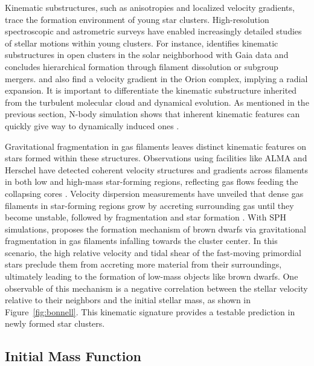 \documentclass[12pt]{ucsddissertation}
\begin{document}
\begin{CJK*}{UTF8}{gbsn}
Kinematic substructures, such as anisotropies and localized velocity gradients, trace the formation environment of young star clusters. High-resolution spectroscopic and astrometric surveys have enabled increasingly detailed studies of stellar motions within young clusters. For instance, \citet{Pang-2022} identifies kinematic substructures in open clusters in the solar neighborhood with Gaia data and concludes hierarchical formation through filament dissolution or subgroup mergers. \citet{Furesz-2008} and \citet{Swiggum-2021} also find a velocity gradient in the Orion complex, implying a radial expansion. It is important to differentiate the kinematic substructure inherited from the turbulent molecular cloud and dynamical evolution. As mentioned in the previous section, N-body simulation shows that inherent kinematic features can quickly give way to dynamically induced ones \citep[][]{Allison-2010}.


Gravitational fragmentation in gas filaments leaves distinct kinematic features on stars formed within these structures. Observations using facilities like ALMA and Herschel have detected coherent velocity structures and gradients across filaments in both low and high-mass star-forming regions, reflecting gas flows feeding the collapsing cores \citep[e.g.,][]{Kirk-2013, Beuther-2015, Kainulainen-2016, Lu-2018}. Velocity dispersion measurements have unveiled that dense gas filaments in star-forming regions grow by accreting surrounding gas until they become unstable, followed by fragmentation and star formation \citep[][]{Arzoumanian-2013}. With SPH simulations, \citet{Bonnell-2008} proposes the formation mechanism of brown dwarfs via gravitational fragmentation in gas filaments infalling towards the cluster center. In this scenario, the high relative velocity and tidal shear of the fast-moving primordial stars preclude them from accreting more material from their surroundings, ultimately leading to the formation of low-mass objects like brown dwarfs. One observable of this mechanism is a negative correlation between the stellar velocity relative to their neighbors and the initial stellar mass, as shown in Figure~\ref{fig:bonnell}. This kinematic signature provides a testable prediction in newly formed star clusters. 



%
\subsection*{Initial Mass Function}%


\end{CJK*}
\end{document}
